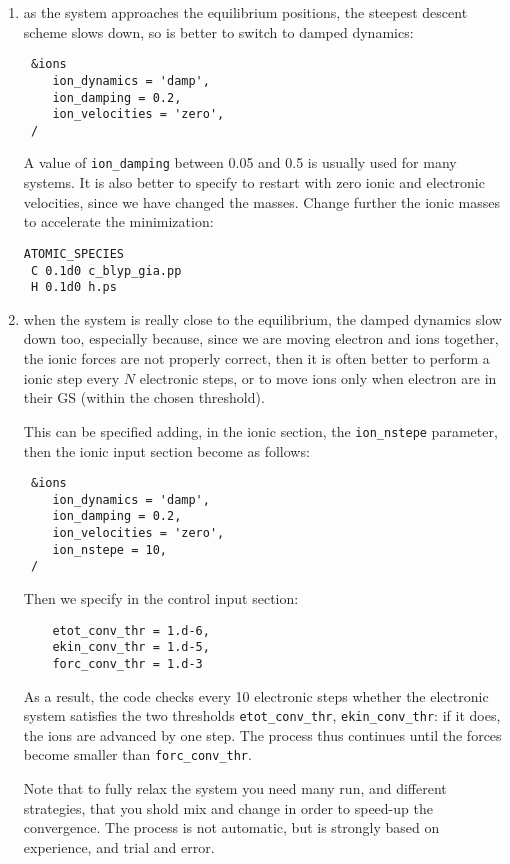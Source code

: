 \documentclass[12pt,a4paper]{article}
\begin{document}
\begin{enumerate}
\begin{enumerate}
      \item
        as the system approaches the equilibrium positions, the
        steepest descent scheme slows down, so is better to switch to
        damped dynamics:
\begin{verbatim}
 &ions
    ion_dynamics = 'damp',
    ion_damping = 0.2,
    ion_velocities = 'zero',
 /
\end{verbatim}
        A value of \texttt{ion\_damping} between 0.05 and 0.5 is
        usually used for many systems.
        It is also better to specify to restart with zero ionic and
        electronic velocities, since we have changed the masses.
        Change further the ionic masses to accelerate the
        minimization:
\begin{verbatim}
ATOMIC_SPECIES
 C 0.1d0 c_blyp_gia.pp
 H 0.1d0 h.ps
\end{verbatim}

      \item
        when the system is really close to the equilibrium, the damped
        dynamics slow down too, especially because, since we are
        moving electron and ions together, the ionic forces are not
        properly correct, then it is often better to perform a ionic
        step every $N$ electronic steps, or to move ions only when
        electron are in their GS (within the chosen threshold).

        This can be specified adding, in the ionic section, the
        \texttt{ion\_nstepe} parameter, then the ionic input section
        become as follows:
\begin{verbatim}
 &ions
    ion_dynamics = 'damp',
    ion_damping = 0.2,
    ion_velocities = 'zero',
    ion_nstepe = 10,
 /
\end{verbatim}
        Then we specify in the control input section:
\begin{verbatim}
    etot_conv_thr = 1.d-6,
    ekin_conv_thr = 1.d-5,
    forc_conv_thr = 1.d-3
\end{verbatim}
        As a result, the code checks every 10 electronic steps whether
        the electronic system satisfies the two thresholds
        \texttt{etot\_conv\_thr}, \texttt{ekin\_conv\_thr}: if it
        does, the ions are advanced by one step.
        The process thus continues until the forces become smaller
        than \texttt{forc\_conv\_thr}.

        Note that to fully relax the system you need many run, and
        different strategies, that you shold mix and change in order
        to speed-up the convergence.
        The process is not automatic, but is strongly based on
        experience, and trial and error.
     

\end{enumerate}
\end{enumerate}
\end{document}
